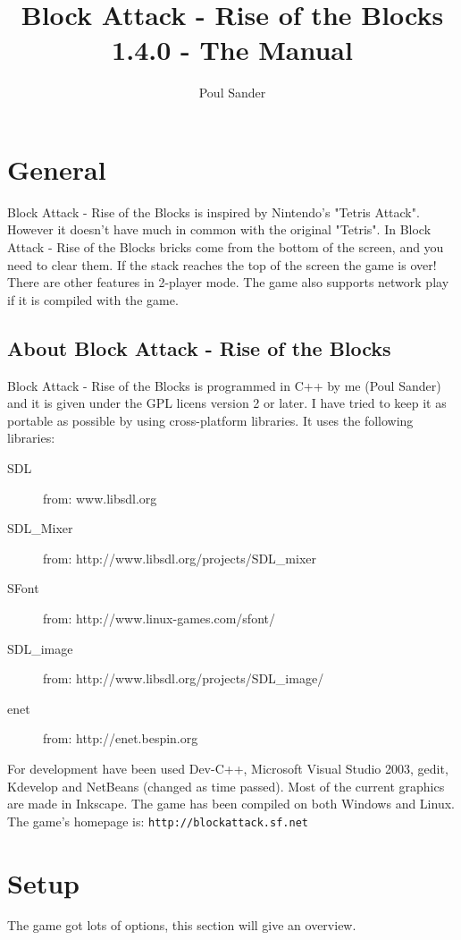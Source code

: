 \documentclass[11pt,a4paper]{article}
\begin{document}
\title{Block Attack - Rise of the Blocks 1.4.0 - The Manual}
\author{Poul Sander}
\maketitle
\tableofcontents
\section{General}
Block Attack - Rise of the Blocks is inspired by Nintendo's
"Tetris Attack". However it doesn't have much in common with the
original "Tetris". In Block Attack - Rise of the Blocks bricks
come from the bottom of the screen, and you need to clear them. If
the stack reaches the top of the screen the game is over! There
are other features in 2-player mode. The game also supports network play 
if it is compiled with the game.
\subsection{About Block Attack - Rise of the Blocks}
Block Attack - Rise of the Blocks is programmed in C++ by me (Poul
Sander) and it is given under the GPL licens version 2 or later. I have tried to keep
it as portable as possible by using cross-platform libraries. It
uses the following libraries:
\begin{description}
\item[SDL] from: \newline www.libsdl.org \item[SDL\_Mixer] from:
\newline http://www.libsdl.org/projects/SDL\_mixer \item[SFont]
from: \newline http://www.linux-games.com/sfont/ \item[SDL\_image]
from: \newline http://www.libsdl.org/projects/SDL\_image/
\item[enet] from: \newline http://enet.bespin.org
\end{description}
For development have been used Dev-C++, Microsoft Visual Studio
2003, gedit, Kdevelop and NetBeans (changed as time passed). Most of the current graphics are made in Inkscape. The
game has been compiled on both Windows and Linux. \newline The
game's homepage is:
\verb+http://blockattack.sf.net+
\section{Setup}
The game got lots of options, this section will give an overview.
\end{document}
